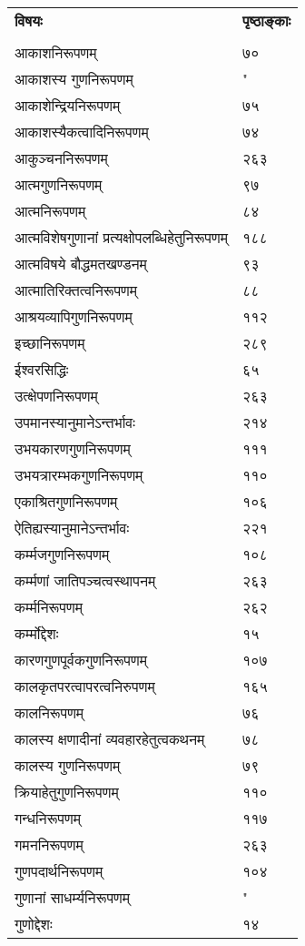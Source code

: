\documentclass[11pt, openany]{book}
\begin{document}
\newpage
\noindent
\begin{tabular}{m{28em} m{2em}}
\textbf{विषयः} & \textbf{पृष्ठाङ्काः}\\
 & \\
 आकाशनिरूपणम् & ७०\\
आकाशस्य गुणनिरूपणम् & "\\
आकाशेन्द्रियनिरूपणम् & ७५\\
आकाशस्यैकत्वादिनिरूपणम् & ७४\\
आकुञ्चननिरूपणम् & २६३\\
आत्मगुणनिरूपणम् & ९७\\
आत्मनिरूपणम् & ८४\\
आत्मविशेषगुणानां प्रत्यक्षोपलब्धिहेतुनिरूपणम् & १८८\\
आत्मविषये बौद्धमतखण्डनम् & ९३\\
आत्मातिरिक्तत्वनिरूपणम् & ८८\\
आश्रयव्यापिगुणनिरूपणम् & ११२\\
इच्छानिरूपणम् & २८९\\
ईश्वरसिद्धिः & ६५\\
उत्क्षेपणनिरूपणम् & २६३\\
उपमानस्यानुमानेऽन्तर्भावः & २१४\\
उभयकारणगुणनिरूपणम् & १११\\
उभयत्रारम्भकगुणनिरूपणम् & ११०\\
एकाश्रितगुणनिरूपणम् & १०६\\
ऐतिह्यस्यानुमानेऽन्तर्भावः & २२१\\
कर्म्मजगुणनिरूपणम् & १०८\\
कर्म्मणां जातिपञ्चत्वस्थापनम् & २६३\\
कर्म्मनिरूपणम् & २६२\\
कर्म्मोद्देशः & १५\\
कारणगुणपूर्वकगुणनिरूपणम् & १०७\\
कालकृतपरत्वापरत्वनिरुपणम् & १६५\\
कालनिरूपणम् & ७६\\
कालस्य क्षणादीनां व्यवहारहेतुत्वकथनम् & ७८\\
कालस्य गुणनिरूपणम् & ७९\\
क्रियाहेतुगुणनिरूपणम् & ११०\\
गन्धनिरूपणम् & ११७\\
गमननिरूपणम् & २६३\\
गुणपदार्थनिरूपणम् & १०४\\
गुणानां साधर्म्यनिरूपणम् & "\\
गुणोद्देशः & १४
\end{tabular}
\end{document}
